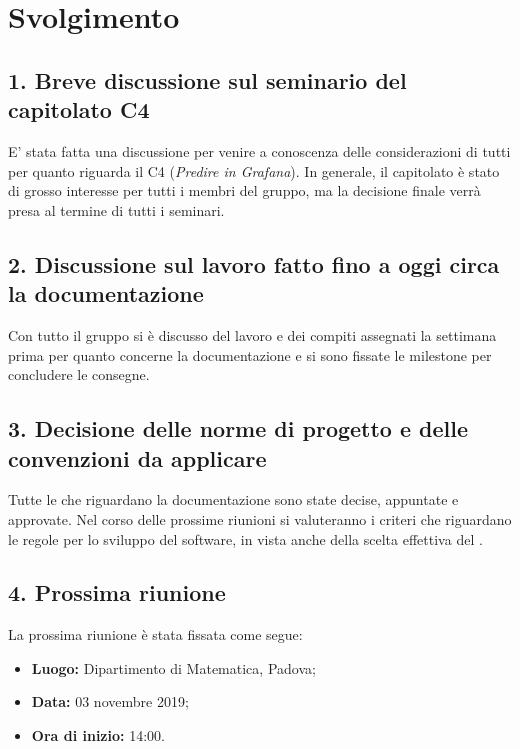 \newpage
\section*{Svolgimento}

\subsection*{1. Breve discussione sul seminario del capitolato C4 }

E' stata fatta una discussione per venire a conoscenza delle considerazioni di tutti per quanto riguarda il  C4 (\textit{Predire in Grafana}). In generale, il capitolato è stato di grosso interesse per tutti i membri del gruppo, ma la decisione finale verrà presa al termine di tutti i seminari.

\subsection*{2. Discussione sul lavoro fatto fino a oggi circa la documentazione}

Con tutto il gruppo si è discusso del lavoro e dei compiti assegnati la settimana prima per quanto concerne la documentazione e si sono fissate le milestone per concludere le consegne.

\subsection*{3. Decisione delle norme di progetto e delle convenzioni da applicare}

Tutte le  che riguardano la documentazione sono state decise, appuntate e approvate. Nel corso delle prossime riunioni si valuteranno i criteri che riguardano le regole per lo sviluppo del software, in vista anche della scelta effettiva del .

\subsection*{4. Prossima riunione}

La prossima riunione è stata fissata come segue:
\begin{itemize}
	\item \textbf{Luogo:} Dipartimento di Matematica, Padova;
	\item \textbf{Data:} 03 novembre 2019;
	\item \textbf{Ora di inizio:} 14:00.
\end{itemize}
